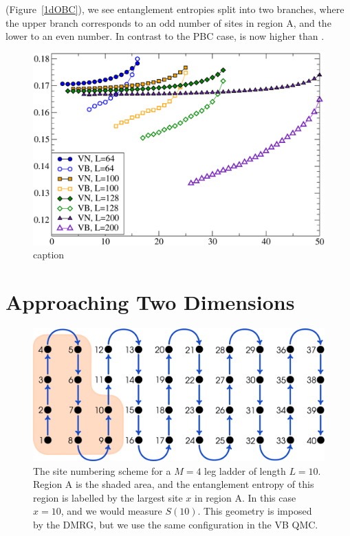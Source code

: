  (Figure~\ref{1dOBC}), we see entanglement entropies split into two branches, where the upper branch corresponds to an odd number of sites in region A, and the lower to an even number.
In contrast to the PBC case, \vb is now higher than \vn.

\begin{figure} {
\includegraphics[width=5in]{./figures/paper1/figure1/fig2_NEW.pdf} 
\centering
\caption[caption]{ 
	caption
}}
\end{figure}


\section{Approaching Two Dimensions}

\begin{figure} { \includegraphics[width=6in]{./figures/made/stuff_covering.pdf}
\centering
\caption[Geometry of a four-leg ladder]{
The site numbering scheme for a $M=4$ leg ladder of length $L=10$.  Region A is the shaded area, and the entanglement entropy of this region is labelled by the largest site $x$ in region A.
In this case $x=10$, and we would measure $S(10)$.  
This geometry is imposed by the DMRG, but we use the same configuration in the VB QMC.
 \label{laddersnake} }} 
 \end{figure}

